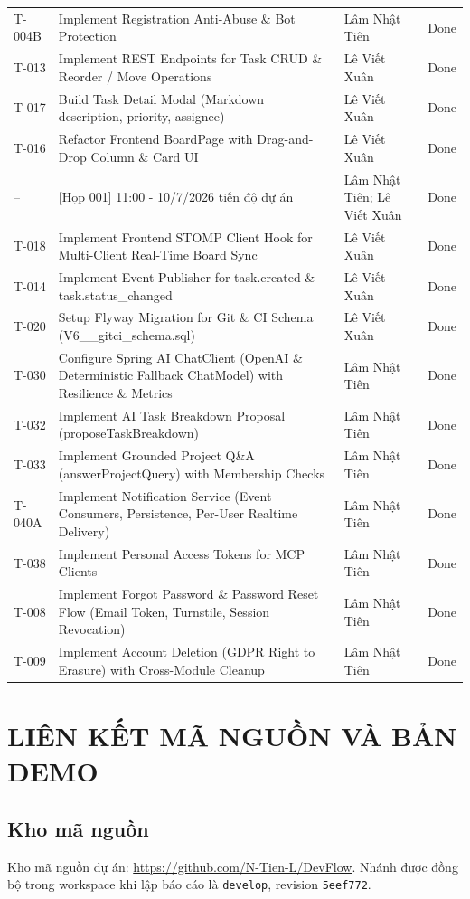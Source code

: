 \documentclass[12pt,a4paper]{report}
\begin{document}
\begin{longtable}{@{}p{1.3cm}p{8.0cm}p{2.7cm}p{2.4cm}@{}}
T-004B & Implement Registration Anti-Abuse \& Bot Protection & Lâm Nhật Tiên & Done \\
T-013 & Implement REST Endpoints for Task CRUD \& Reorder / Move Operations & Lê Viết Xuân & Done \\
T-017 & Build Task Detail Modal (Markdown description, priority, assignee) & Lê Viết Xuân & Done \\
T-016 & Refactor Frontend BoardPage with Drag-and-Drop Column \& Card UI & Lê Viết Xuân & Done \\
-- & [Họp 001] 11:00 - 10/7/2026 tiến độ dự án & Lâm Nhật Tiên; Lê Viết Xuân & Done \\
T-018 & Implement Frontend STOMP Client Hook for Multi-Client Real-Time Board Sync & Lê Viết Xuân & Done \\
T-014 & Implement Event Publisher for task.created \& task.status\_changed & Lê Viết Xuân & Done \\
T-020 & Setup Flyway Migration for Git \& CI Schema (V6\_\_gitci\_schema.sql) & Lê Viết Xuân & Done \\
T-030 & Configure Spring AI ChatClient (OpenAI \& Deterministic Fallback ChatModel) with Resilience \& Metrics & Lâm Nhật Tiên & Done \\
T-032 & Implement AI Task Breakdown Proposal (proposeTaskBreakdown) & Lâm Nhật Tiên & Done \\
T-033 & Implement Grounded Project Q\&A (answerProjectQuery) with Membership Checks & Lâm Nhật Tiên & Done \\
T-040A & Implement Notification Service (Event Consumers, Persistence, Per-User Realtime Delivery) & Lâm Nhật Tiên & Done \\
T-038 & Implement Personal Access Tokens for MCP Clients & Lâm Nhật Tiên & Done \\
T-008 & Implement Forgot Password \& Password Reset Flow (Email Token, Turnstile, Session Revocation) & Lâm Nhật Tiên & Done \\
T-009 & Implement Account Deletion (GDPR Right to Erasure) with Cross-Module Cleanup & Lâm Nhật Tiên & Done \\
\end{longtable}
\normalsize

\chapter{LIÊN KẾT MÃ NGUỒN VÀ BẢN DEMO}
\section{Kho mã nguồn}
Kho mã nguồn dự án: \url{https://github.com/N-Tien-L/DevFlow}. Nhánh được đồng bộ trong workspace khi lập báo cáo là \texttt{develop}, revision \texttt{5eef772}.
\end{document}
